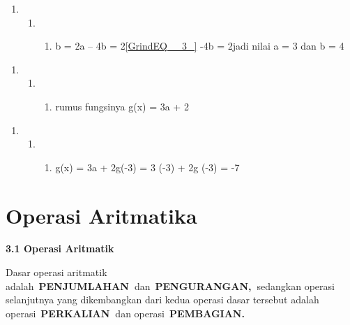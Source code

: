 \documentclass[11pt,fleqn]{book} %
\begin{document}
\noindent 

\noindent 

\noindent 

\noindent 

\noindent 

\noindent 

\begin{enumerate}
\item \begin{enumerate}
\item \begin{enumerate}
\item  b = 2a -- 4b = 2\eqref{GrindEQ__3_} -4b = 2jadi nilai a = 3 dan b = 4
\end{enumerate}
\end{enumerate}
\end{enumerate}

\noindent 

\begin{enumerate}
\item \begin{enumerate}
\item \begin{enumerate}
\item  rumus fungsinya g(x) = 3a + 2
\end{enumerate}
\end{enumerate}
\end{enumerate}

\noindent 

\begin{enumerate}
\item \begin{enumerate}
\item \begin{enumerate}
\item  g(x) = 3a + 2g(-3) = 3 (-3) + 2g (-3) = -7
\end{enumerate}
\end{enumerate}
\end{enumerate}

\noindent 

\noindent

\section{Operasi Aritmatika}

\noindent \textbf{3.1 Operasi Aritmatik}

Dasar operasi aritmatik adalah~\textbf{PENJUMLAHAN~}dan~\textbf{PENGURANGAN,~}sedangkan operasi selanjutnya yang dikembangkan dari kedua operasi dasar tersebut adalah operasi~\textbf{PERKALIAN~}dan operasi~\textbf{PEMBAGIAN.}
\end{document}

